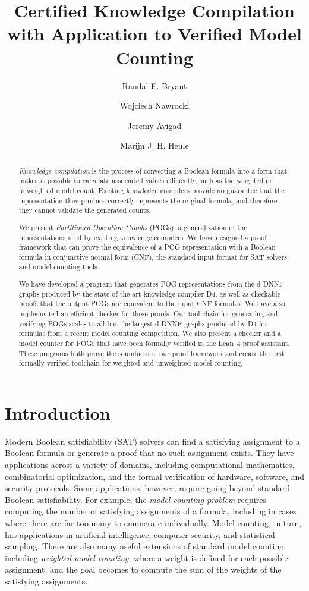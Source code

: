 \documentclass[letterpaper,USenglish,cleveref, autoref, thm-restate]{lipics-v2021}
\title{Certified Knowledge Compilation \\ with Application to Verified Model Counting}
\author{Randal E. Bryant}{Computer Science Department, Carnegie Mellon University, Pittsburgh, PA 15213 USA}{rebryant@cmu.edu}{https://orcid.org/0000-0001-5024-6613}{Supported by NSF grant CCF-2108521}
\author{Wojciech Nawrocki}{Department of Philosophy, Carnegie Mellon University}{wjnawrock@cmu.edu}{https://orcid.org/0000-0002-8839-0618}{}
\author{Jeremy Avigad}{Department of Philosophy, Carnegie Mellon University}{avigad@cmu.edu}{https://orcid.org/0000-0003-1275-315X}{}
\author{Marijn J. H. Heule}{Computer Science Department, Carnegie Mellon University}{marijn@cmu.edu}{https://orcid.org/0000-0002-5587-8801}{Supported by NSF grant CCF-2108521}
\newcommand{\progname}[1]{\textsc{#1}}
\newcommand{\dfour}{\progname{D4}}
\newcommand{\lean}{Lean~4}
\begin{document}
\maketitle

\begin{abstract}

\emph{Knowledge compilation} is the process of converting a Boolean
formula into a form that makes it possible to calculate associated
values efficiently, such as the weighted or unweighted model
count. Existing knowledge compilers
provide no guarantee that the representation they produce
correctly represents the original formula, and therefore they cannot validate the generated counts.

We present \emph{Partitioned Operation Graphs} (POGs), a generalization
of the representations used by existing knowledge compilers.
We have designed a proof framework that can prove the equivalence of a
POG representation with a Boolean formula in conjunctive normal form (CNF),
the standard input format for SAT solvers and model counting tools.

We have developed a program that generates POG representations from
the d-DNNF graphs produced by the state-of-the-art knowledge compiler
\dfour, as well as checkable proofs that the output POGs
are equivalent to the input CNF formulas.  We have also implemented an
efficient checker for these proofs. Our tool chain
for generating and verifying POGs scales to all but the largest d-DNNF
graphs produced by \dfour{} for formulas from a recent model counting
competition. We also present a checker and a model counter for POGs that have
been formally verified in the \lean{} proof assistant.  These programs both prove the soundness of our proof framework and
create the first formally verified toolchain for weighted and unweighted model counting.
\end{abstract}

\section{Introduction}

Modern Boolean satisfiability (SAT) solvers can
find a satisfying assignment to a Boolean formula or generate a proof that no
such assignment exists.  They have applications across a variety of
domains, including computational mathematics, combinatorial
optimization, and the formal verification of hardware, software, and
security protocols.  Some applications, however, require going
beyond standard Boolean satisfiability.  For example, the {\em model
  counting problem} requires computing the number of satisfying
assignments of a formula, including in cases where there are far too many
to enumerate individually.  Model counting, in turn, has
applications in artificial intelligence, computer security, and
statistical sampling.  There are also many useful extensions of standard model counting,
including {\em
  weighted model counting}, where a weight is defined for
each possible assignment, and the goal becomes to compute the sum of the weights
of the satisfying assignments.
\end{document}
